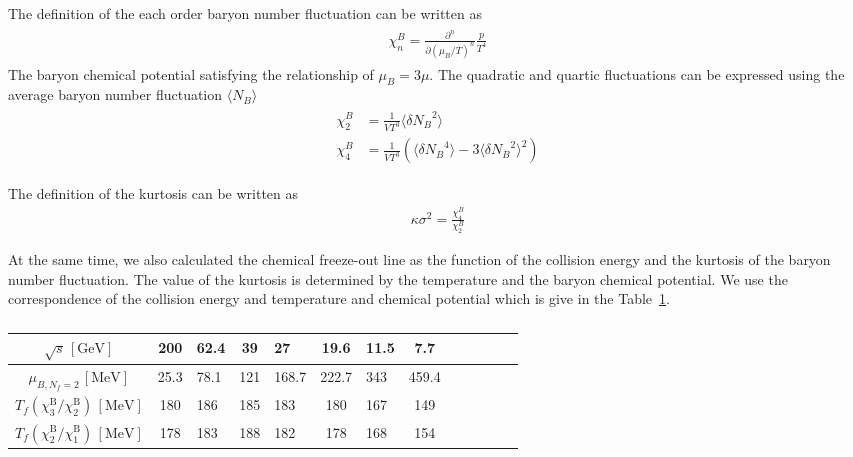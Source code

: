 \documentclass[%
reprint,
superscriptaddress,
showpacs,preprintnumbers,
 amsmath,amssymb,
 aps,
prd,
]{revtex4-1}
\begin{document}
The definition of the each order baryon number fluctuation can be written as
\begin{align}\label{}
\begin{split}
\chi^{B}_{n}=\frac{\partial^n}{\partial(\mu_B/T)^n}\frac{p}{T^4}
\end{split}
\end{align} 
The baryon chemical potential satisfying the relationship of $\mu_B=3\mu$. The quadratic and quartic fluctuations can be expressed using the 
average baryon number fluctuation $\langle N_B \rangle$
\begin{align}\label{}
\begin{split}
\chi^{B}_{2}&=\frac{1}{VT^3}\langle \delta {N_B}^2 \rangle\\
\chi^{B}_{4}&=\frac{1}{VT^3}\left( \langle \delta {N_B}^4 \rangle-3\langle \delta {N_B}^2 \rangle^2 \right)
\end{split}
\end{align}

The definition of the kurtosis can be written as
\begin{align}
\kappa \sigma^2=\frac{\chi^{B}_{4}}{\chi^{B}_{2}}
\end{align}\par
At the same time, we also calculated the chemical freeze-out line as the function of the collision energy and the kurtosis of the baryon
number fluctuation. The value of the kurtosis is determined by the temperature and the baryon chemical potential. We use the correspondence
of the collision energy and temperature and chemical potential which is give in the Table~\ref{tab:cle}.
\begin{table}[h]
  \centering
  \begin{tabular}[c]{c|clclclclclcl}
    \hline \hline
    $\sqrt{s}\,[\mathrm{GeV}]$ & 200 & 62.4 & 39 & 27 & 19.6 & 11.5 & 7.7\\ \hline
    $\mu_{B,N_f=2}\,[\mathrm{MeV}]$&25.3&78.1&121&168.7&222.7&343&459.4\\ \hline
    $T_f(\chi_3^{\mathrm{B}}/\chi_2^{\mathrm{B}})\,[\mathrm{MeV}]$&180&186&185&183&180&167&149\\ \hline
    $T_f(\chi_2^{\mathrm{B}}/\chi_1^{\mathrm{B}})\,[\mathrm{MeV}]$&178&183&188&182&178&168&154\\ \hline
  \end{tabular}
  \caption{ }
  \label{tab:cle}
\end{table}

\end{document}
